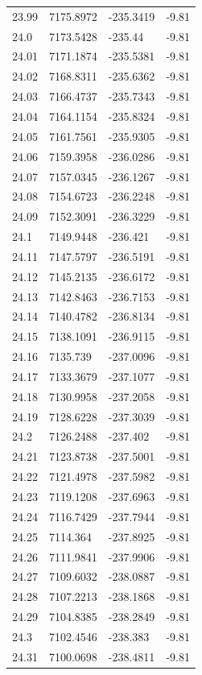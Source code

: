 \begin{table}[H]
\begin{tabular}{llll}
23.99 & 7175.8972 & -235.3419 & -9.81 \\
24.0 & 7173.5428 & -235.44 & -9.81 \\
24.01 & 7171.1874 & -235.5381 & -9.81 \\
24.02 & 7168.8311 & -235.6362 & -9.81 \\
24.03 & 7166.4737 & -235.7343 & -9.81 \\
24.04 & 7164.1154 & -235.8324 & -9.81 \\
24.05 & 7161.7561 & -235.9305 & -9.81 \\
24.06 & 7159.3958 & -236.0286 & -9.81 \\
24.07 & 7157.0345 & -236.1267 & -9.81 \\
24.08 & 7154.6723 & -236.2248 & -9.81 \\
24.09 & 7152.3091 & -236.3229 & -9.81 \\
24.1 & 7149.9448 & -236.421 & -9.81 \\
24.11 & 7147.5797 & -236.5191 & -9.81 \\
24.12 & 7145.2135 & -236.6172 & -9.81 \\
24.13 & 7142.8463 & -236.7153 & -9.81 \\
24.14 & 7140.4782 & -236.8134 & -9.81 \\
24.15 & 7138.1091 & -236.9115 & -9.81 \\
24.16 & 7135.739 & -237.0096 & -9.81 \\
24.17 & 7133.3679 & -237.1077 & -9.81 \\
24.18 & 7130.9958 & -237.2058 & -9.81 \\
24.19 & 7128.6228 & -237.3039 & -9.81 \\
24.2 & 7126.2488 & -237.402 & -9.81 \\
24.21 & 7123.8738 & -237.5001 & -9.81 \\
24.22 & 7121.4978 & -237.5982 & -9.81 \\
24.23 & 7119.1208 & -237.6963 & -9.81 \\
24.24 & 7116.7429 & -237.7944 & -9.81 \\
24.25 & 7114.364 & -237.8925 & -9.81 \\
24.26 & 7111.9841 & -237.9906 & -9.81 \\
24.27 & 7109.6032 & -238.0887 & -9.81 \\
24.28 & 7107.2213 & -238.1868 & -9.81 \\
24.29 & 7104.8385 & -238.2849 & -9.81 \\
24.3 & 7102.4546 & -238.383 & -9.81 \\
24.31 & 7100.0698 & -238.4811 & -9.81 \\

\end{tabular}
\end{table}
